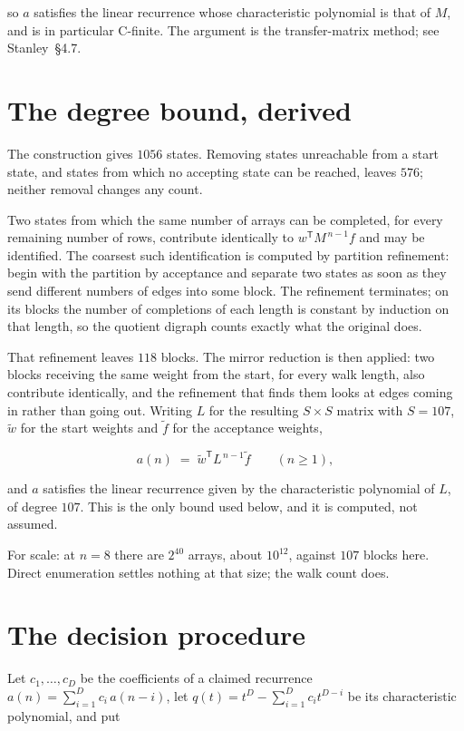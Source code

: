 \documentclass[11pt]{article}
\theoremstyle{definition}
\begin{document}
so $a$ satisfies the linear recurrence whose characteristic polynomial is that of $M$, and is in particular C-finite. The argument is the transfer-matrix method; see Stanley~\S4.7.

\section{The degree bound, derived}

The construction gives $1056$ states. Removing states unreachable from a start state, and states from which no accepting state can be reached, leaves $576$; neither removal changes any count.

Two states from which the same number of arrays can be completed, for every remaining number of rows, contribute identically to $w^{\mathsf T}M^{\,n-1}f$ and may be identified. The coarsest such identification is computed by partition refinement: begin with the partition by acceptance and separate two states as soon as they send different numbers of edges into some block. The refinement terminates; on its blocks the number of completions of each length is constant by induction on that length, so the quotient digraph counts exactly what the original does.

That refinement leaves $118$ blocks. The mirror reduction is then applied: two blocks receiving the same weight from the start, for every walk length, also contribute identically, and the refinement that finds them looks at edges coming in rather than going out. Writing $L$ for the resulting $S \times S$ matrix with $S = 107$, $\tilde w$ for the start weights and $\tilde f$ for the acceptance weights,

\[a(n) \;=\; \tilde w^{\mathsf T} L^{\,n-1} \tilde f \qquad (n \ge 1),\]

and $a$ satisfies the linear recurrence given by the characteristic polynomial of $L$, of degree $107$. This is the only bound used below, and it is computed, not assumed.

For scale: at $n = 8$ there are $2^{40}$ arrays, about $10^{12}$, against $107$ blocks here. Direct enumeration settles nothing at that size; the walk count does.

\section{The decision procedure}

Let $c_1,\dots,c_D$ be the coefficients of a claimed recurrence $a(n) = \sum_{i=1}^{D} c_i\,a(n-i)$, let $q(t) = t^{D} - \sum_{i=1}^{D} c_i t^{D-i}$ be its characteristic polynomial, and put
\end{document}
